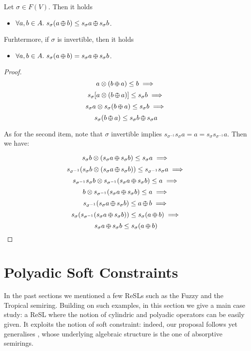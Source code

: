 \documentclass{llncs}
\def\odiv{\, {\ominus\hspace{-7.7pt} \div} \,}
\begin{document}
\begin{lemma}
Let $\sigma \in F(V)$. Then it holds
\begin{itemize}
\item $\forall a,b \in A.\ s_\sigma (a \odiv b) \leq s_\sigma a \odiv s_\sigma b$.
\end{itemize}
Furhtermore, if $\sigma$ is invertible, then it holds
\begin{itemize}
\item $\forall a,b \in A.\ s_\sigma (a \odiv b) = s_\sigma a \odiv s_\sigma b$.
\end{itemize}
\end{lemma}

\begin{proof}
\[ a \otimes (b \odiv a) \leq b \implies \]
\[ s_\sigma [a \otimes (b \odiv a)] \leq s_\sigma b \implies \]
\[ s_\sigma a \otimes s_\sigma(b \odiv a) \leq s_\sigma b \implies \]
\[ s_\sigma (b \odiv a) \leq s_\sigma b \odiv s_\sigma a \]

As for the second item, note that $\sigma$ invertible implies $s_{\sigma^{-1}} s_{\sigma} a = a 
= s_{\sigma} s_{\sigma^{-1}} a$. Then we have:

\[ s_\sigma b \otimes (s_\sigma a \odiv s_\sigma b) \leq s_\sigma a  \implies \]
\[ s_{\sigma^{-1}} (s_\sigma b \otimes (s_\sigma a \odiv s_\sigma b))
\leq s_{\sigma^{-1}} s_\sigma a  \implies \]
\[ s_{\sigma^{-1}} s_\sigma b \otimes s_{\sigma^{-1}} (s_\sigma a \odiv s_\sigma b) \leq a \implies \]
\[ b \otimes s_{\sigma^{-1}} (s_\sigma a \odiv s_\sigma b) \leq a \implies \]
\[ s_{\sigma^{-1}} (s_\sigma a \odiv s_\sigma b) \leq a \odiv b \implies \]
\[ s_\sigma (s_{\sigma^{-1}} (s_\sigma a \odiv s_\sigma b)) \leq s_\sigma (a \odiv b) \implies \]
\[ s_\sigma a \odiv s_\sigma b \leq s_\sigma (a \odiv b) \]
\end{proof}

\section{Polyadic Soft Constraints}\label{sec:softconstraints}
\label{subsec:inst} 
In the past sections we mentioned a few ReSLs such as 
the Fuzzy 
and the Tropical semiring.
%
Building on such examples, in this section we give a main case study: a ReSL 
where the notion of cylindric and polyadic operators can be easily given.
It exploits the notion
of soft constraint: indeed, our proposal follows yet generalises \cite{scc},
whose underlying algebraic structure is the one of absorptive semirings.
\end{document}
